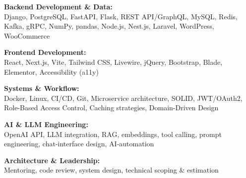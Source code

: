 \begin{CVsidebar}
\textbf{Backend Development \& Data:} \\
\vspace{0.1em}
{\small Django, PostgreSQL, FastAPI, Flask, REST API/GraphQL, MySQL, Redis, Kafka, gRPC, NumPy, pandas, Node.js, Nest.js, Laravel, WordPress, WooCommerce} \\
\dotline

\textbf{Frontend Development:} \\
\vspace{0.1em}
{\small React, Next.js, Vite, Tailwind CSS, Livewire, jQuery, Bootstrap, Blade, Elementor, Accessibility (a11y)} \\
\dotline

\textbf{Systems \& Workflow:} \\
\vspace{0.1em}
{\small Docker, Linux, CI/CD, Git, Microservice architecture, SOLID, JWT/OAuth2, Role-Based Access Control, Caching strategies, Domain-Driven Design} \\
\dotline

\textbf{AI \& LLM Engineering:} \\
\vspace{0.1em}
{\small OpenAI API, LLM integration, RAG, embeddings, tool calling, prompt engineering, chat-interface design, AI-automation} \\
\dotline


\textbf{Architecture \& Leadership:} \\
\vspace{0.1em}
{\small Mentoring, code review, system design, technical scoping \& estimation} \\


\end{CVsidebar}
